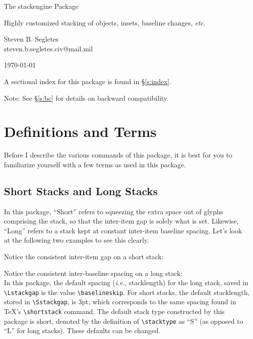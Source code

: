 \documentclass{article}
\def\rl{\rule[-.3pt]{2ex}{.6pt}}
\def\ste{\textsf{stackengine}}
\let\vb\verb
\begin{document}
\begin{center}
\LARGE The {\ste} Package\\
\rule{0em}{.7em}\small Highly customized stacking of objects, insets,
baseline changes, \textit{etc.}\\
\rule{0em}{2.7em}\large Steven B. Segletes\\
steven.b.segletes.civ@mail.mil\\
\rule{0em}{1.7em}\today\\
\stackengineversionnumber%
\end{center}


\sffamily%
A sectional index for this package is found in \S\ref{s:index}.

Note: See \S\ref{s:bc} for details on backward compatibility.
\rmfamily%

\section{Definitions and Terms}

Before I describe the various commands of this package, it is best for
you to familiarize yourself with a few terms as used in this package.

\subsection{Short Stacks and Long Stacks\label{s:st}}
\def\stacktype{L}
\Huge{}
\normalsize 

In this package, ``Short'' refers to squeezing the extra space out of
glyphs comprising the stack, so that the inter-item gap is solely what
is set.  Likewise, ``Long'' refers to a stack kept at constant
inter-item baseline spacing.  Let's look at the following two
examples to see this clearly.

Notice the consistent inter-item gap on a short stack: 
\Huge
{}
\normalsize

Notice the consistent inter-baseline spacing on a long stack: 
\Huge
\Longstack{{{\rl t}} {{\rl y}} {{\rl k}} {{\rl e}}}
\normalsize\\

In this package, the default spacing (\textit{i.e.}, stacklength) for
the long stack, saved in \vb|\Lstackgap| is the value
\vb|\baselineskip|.  For short stacks, the default stacklength, stored in
\vb|\Sstackgap|, is 3pt, which corresponds to the same spacing found in
\TeX's \vb|\shortstack| command.  The default stack type constructed by
this package is short, denoted by the definition of \vb|\stacktype| as
``S'' (as opposed to ``L'' for long stacks).  These defaults can be
changed.
\end{document}
